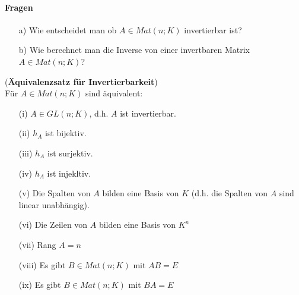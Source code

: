 \documentclass[11pt]{report}
\newcommand*\f[1] {\textbf{#1}}
\begin{document}
\paragraph{Fragen}
\begin{itemize}
 \item[a)] Wie entscheidet man ob $A \in Mat(n;K)$ invertierbar ist?
 \item[b)] Wie berechnet man die Inverse von einer invertbaren Matrix $A \in Mat(n;K)$?
\end{itemize}

\begin{satz} (\f{Äquivalenzsatz für Invertierbarkeit}) \\
\label{satz534}
Für $A \in Mat(n;K)$ sind äquivalent:
\begin{itemize}
 \item[(i)] $A \in GL(n;K)$, d.h. $A$ ist invertierbar.
 \item[(ii)] $h_A$ ist bijektiv.
 \item[(iii)] $h_A$ ist surjektiv.
 \item[(iv)] $h_A$ ist injekltiv.
 \item[(v)] Die Spalten von $A$ bilden eine Basis von $K$ (d.h. die Spalten von $A$ sind linear unabhängig).
 \item[(vi)] Die Zeilen von $A$ bilden eine Basis von $K^n$
 \item[(vii)] Rang $A = n$
 \item[(viii)] Es gibt $B \in Mat(n;K)$ mit $AB = E$
 \item[(ix)] Es gibt $B \in Mat(n;K)$ mit $BA = E$
\end{itemize}
\end{satz}
\end{document}
